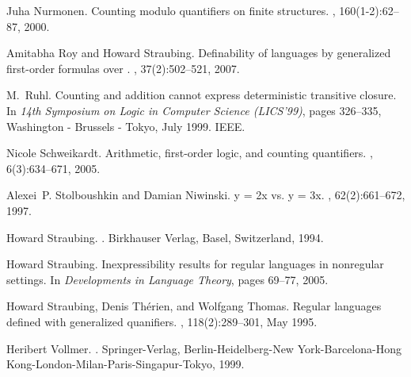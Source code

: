 \documentclass[envcountsame]{llncs}
\begin{document}
\begin{thebibliography}{10}
Juha Nurmonen.
\newblock Counting modulo quantifiers on finite structures.
, 160(1-2):62--87, 2000.

Amitabha Roy and Howard Straubing.
\newblock Definability of languages by generalized first-order formulas over
  {}.
, 37(2):502--521, 2007.

M.~Ruhl.
\newblock Counting and addition cannot express deterministic transitive
  closure.
\newblock In {\em 14th Symposium on Logic in Computer Science ({LICS}'99)},
  pages 326--335, Washington - Brussels - Tokyo, July 1999. IEEE.

Nicole Schweikardt.
\newblock Arithmetic, first-order logic, and counting quantifiers.
, 6(3):634--671, 2005.

Alexei~P. Stolboushkin and Damian Niwinski.
\newblock y = 2x vs. y = 3x.
, 62(2):661--672, 1997.

Howard Straubing.
.
\newblock Birkhauser Verlag, Basel, Switzerland, 1994.

Howard Straubing.
\newblock Inexpressibility results for regular languages in nonregular
  settings.
\newblock In {\em Developments in Language Theory}, pages 69--77, 2005.

Howard Straubing, Denis Th{\'e}rien, and Wolfgang Thomas.
\newblock Regular languages defined with generalized quanifiers.
, 118(2):289--301, May 1995.

Heribert Vollmer.
.
\newblock Springer-Verlag, Berlin-Heidelberg-New York-Barcelona-Hong
  Kong-London-Milan-Paris-Singapur-Tokyo, 1999.

\end{thebibliography}
\end{document}
